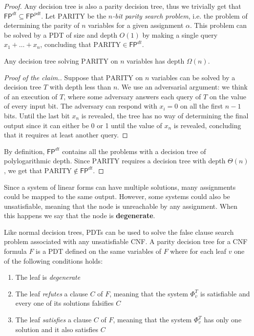 \begin{proof}
    Any decision tree is also a parity decision tree, thus we trivially get that $\mathsf{FP}^{dt} \subseteq \mathsf{FP}^{pdt}$. Let $\mathrm{PARITY}$ be the \textit{$n$-bit parity search problem}, i.e. the problem of determining the parity of $n$ variables for a given assignment $\alpha$. This problem can be solved by a PDT of size and depth $O(1)$ by making a single query $x_1 + \ldots + x_n$, concluding that $\mathrm{PARITY} \in \mathsf{FP}^{dt}$.
    
    \begin{claim}
        Any decision tree solving $\mathrm{PARITY}$ on $n$ variables has depth $\Omega(n)$.
    \end{claim}

    \begin{proof}[Proof of the claim.]
        Suppose that $\mathrm{PARITY}$ on $n$ variables can be solved by a decision tree $T$ with depth less than $n$. We use an adversarial argument: we think of an execution
        of $T$, where some adversary answers each query of $T$ on the value of every input bit. The adversary can respond with $x_i = 0$ on all the first $n-1$ bits. Until the last bit $x_n$ is revealed, the tree has no way of determining the final output since it can either be 0 or 1 until the value of $x_n$ is revealed, concluding that it requires at least another query.
    \end{proof}
    
    By definition, $\mathsf{FP}^{dt}$ contains all the problems with a decision tree of polylogarithmic depth. Since $\mathrm{PARITY}$ requires a decision tree with depth $\Theta(n)$, we get that $\mathrm{PARITY} \notin \mathsf{FP}^{dt}$.
\end{proof}

Since a system of linear forms can have multiple solutions, many assignments could be mapped to the same output. However, some systems could also be unsatisfiable, meaning that the node is unreachable by any assignment. When this happens we say that the node is \textbf{degenerate}.

Like normal decision trees, PDTs can be used to solve the false clause search problem associated with any unsatisfiable CNF. A parity decision tree for a CNF formula $F$ is a PDT defined on the same variables of $F$ where for each leaf $v$ one of the following conditions holds:
\begin{enumerate}[itemsep=0em]
    \item The leaf is \textit{degenerate}
    \item The leaf \textit{refutes} a clause $C$ of $F$, meaning that the system $\Phi_v^T$ is satisfiable and every one of its solutions falsifies $C$
    \item The leaf \textit{satisfies} a clause $C$ of $F$, meaning that the system $\Phi_v^T$ has only one solution and it also satisfies $C$
\end{enumerate}

